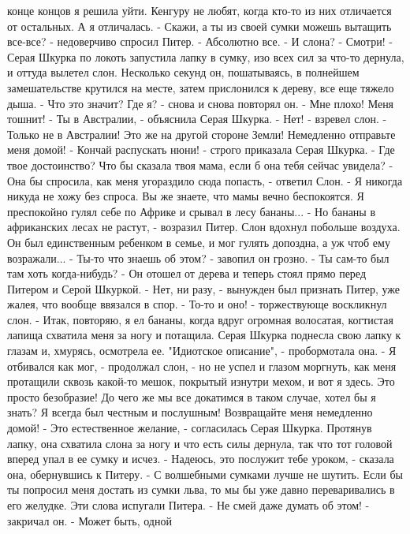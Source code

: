 конце концов я решила уйти. Кенгуру не любят, когда кто-то из них 
отличается от остальных. А я отличалась.
    - Скажи, а ты из своей сумки можешь вытащить все-все? - 
недоверчиво спросил Питер.
    - Абсолютно все.
    - И слона?
    - Смотри! - Серая Шкурка по локоть запустила лапку в сумку, изо 
всех сил за что-то дернула, и оттуда вылетел слон. Несколько секунд 
он, пошатываясь, в полнейшем замешательстве крутился на месте, затем 
прислонился к дереву, все еще тяжело дыша.
    - Что это значит? Где я? - снова и снова повторял он. - Мне плохо! 
Меня тошнит!
    - Ты в Австралии, - объяснила Серая Шкурка.
    - Нет! - взревел слон. - Только не в Австралии! Это же на другой 
стороне Земли! Немедленно отправьте меня домой!
    - Кончай распускать нюни! - строго приказала Серая Шкурка. - Где 
твое достоинство? Что бы сказала твоя мама, если б она тебя сейчас 
увидела?
    - Она бы спросила, как меня угораздило сюда попасть, - ответил 
Слон. - Я никогда никуда не хожу без спроса. Вы же знаете, что мамы 
вечно беспокоятся. Я преспокойно гулял себе по Африке и срывал в лесу 
бананы...
    - Но бананы в африканских лесах не растут, - возразил Питер.
    Слон вдохнул побольше воздуха. Он был единственным ребенком в 
семье, и мог гулять допоздна, а уж чтоб ему возражали...
    - Ты-то что знаешь об этом? - завопил он грозно. - Ты сам-то был 
там хоть когда-нибудь? - Он отошел от дерева и теперь стоял прямо 
перед Питером и Серой Шкуркой.
    - Нет, ни разу, - вынужден был признать Питер, уже жалея, что 
вообще ввязался в спор.
    - То-то и оно! - торжествующе воскликнул слон. - Итак, повторяю, я 
ел бананы, когда вдруг огромная волосатая, когтистая лапища схватила 
меня за ногу и потащила.
    Серая Шкурка поднесла свою лапку к глазам и, хмурясь, осмотрела 
ее. "Идиотское описание", - пробормотала она.
    - Я отбивался как мог, - продолжал слон, - но не успел и глазом 
моргнуть, как меня протащили сквозь какой-то мешок, покрытый изнутри 
мехом, и вот я здесь. Это просто безобразие! До чего же мы все 
докатимся в таком случае, хотел бы я знать? Я всегда был честным и 
послушным! Возвращайте меня немедленно домой!
    - Это естественное желание, - согласилась Серая Шкурка. Протянув 
лапку, она схватила слона за ногу и что есть силы дернула, так что тот 
головой вперед упал в ее сумку и исчез.
    - Надеюсь, это послужит тебе уроком, - сказала она, обернувшись к 
Питеру. - С волшебными сумками лучше не шутить. Если бы ты попросил 
меня достать из сумки льва, то мы бы уже давно переваривались в его 
желудке.
    Эти слова испугали Питера.
    - Не смей даже думать об этом! - закричал он. - Может быть, одной 
